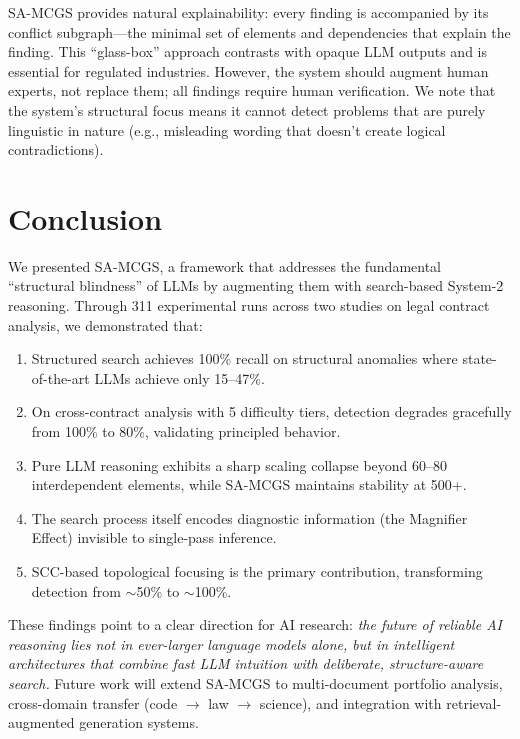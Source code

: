 \documentclass{article}
\begin{document}
SA-MCGS provides natural explainability: every finding is accompanied by its conflict subgraph---the minimal set of elements and dependencies that explain the finding. This ``glass-box'' approach contrasts with opaque LLM outputs and is essential for regulated industries. However, the system should augment human experts, not replace them; all findings require human verification. We note that the system's structural focus means it cannot detect problems that are purely linguistic in nature (e.g., misleading wording that doesn't create logical contradictions).

\section{Conclusion}

We presented SA-MCGS, a framework that addresses the fundamental ``structural blindness'' of LLMs by augmenting them with search-based System-2 reasoning. Through 311 experimental runs across two studies on legal contract analysis, we demonstrated that:

\begin{enumerate}[leftmargin=*,itemsep=1pt]
    \item Structured search achieves 100\% recall on structural anomalies where state-of-the-art LLMs achieve only 15--47\%.
    \item On cross-contract analysis with 5 difficulty tiers, detection degrades gracefully from 100\% to 80\%, validating principled behavior.
    \item Pure LLM reasoning exhibits a sharp scaling collapse beyond 60--80 interdependent elements, while SA-MCGS maintains stability at 500+.
    \item The search process itself encodes diagnostic information (the Magnifier Effect) invisible to single-pass inference.
    \item SCC-based topological focusing is the primary contribution, transforming detection from $\sim$50\% to $\sim$100\%.
\end{enumerate}

These findings point to a clear direction for AI research: \emph{the future of reliable AI reasoning lies not in ever-larger language models alone, but in intelligent architectures that combine fast LLM intuition with deliberate, structure-aware search.} Future work will extend SA-MCGS to multi-document portfolio analysis, cross-domain transfer (code $\to$ law $\to$ science), and integration with retrieval-augmented generation systems.
\end{document}
